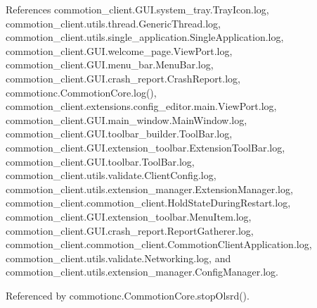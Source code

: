 References commotion\-\_\-client.\-G\-U\-I.\-system\-\_\-tray.\-Tray\-Icon.\-log, commotion\-\_\-client.\-utils.\-thread.\-Generic\-Thread.\-log, commotion\-\_\-client.\-utils.\-single\-\_\-application.\-Single\-Application.\-log, commotion\-\_\-client.\-G\-U\-I.\-welcome\-\_\-page.\-View\-Port.\-log, commotion\-\_\-client.\-G\-U\-I.\-menu\-\_\-bar.\-Menu\-Bar.\-log, commotion\-\_\-client.\-G\-U\-I.\-crash\-\_\-report.\-Crash\-Report.\-log, commotionc.\-Commotion\-Core.\-log(), commotion\-\_\-client.\-extensions.\-config\-\_\-editor.\-main.\-View\-Port.\-log, commotion\-\_\-client.\-G\-U\-I.\-main\-\_\-window.\-Main\-Window.\-log, commotion\-\_\-client.\-G\-U\-I.\-toolbar\-\_\-builder.\-Tool\-Bar.\-log, commotion\-\_\-client.\-G\-U\-I.\-extension\-\_\-toolbar.\-Extension\-Tool\-Bar.\-log, commotion\-\_\-client.\-G\-U\-I.\-toolbar.\-Tool\-Bar.\-log, commotion\-\_\-client.\-utils.\-validate.\-Client\-Config.\-log, commotion\-\_\-client.\-utils.\-extension\-\_\-manager.\-Extension\-Manager.\-log, commotion\-\_\-client.\-commotion\-\_\-client.\-Hold\-State\-During\-Restart.\-log, commotion\-\_\-client.\-G\-U\-I.\-extension\-\_\-toolbar.\-Menu\-Item.\-log, commotion\-\_\-client.\-G\-U\-I.\-crash\-\_\-report.\-Report\-Gatherer.\-log, commotion\-\_\-client.\-commotion\-\_\-client.\-Commotion\-Client\-Application.\-log, commotion\-\_\-client.\-utils.\-validate.\-Networking.\-log, and commotion\-\_\-client.\-utils.\-extension\-\_\-manager.\-Config\-Manager.\-log.



Referenced by commotionc.\-Commotion\-Core.\-stop\-Olsrd().



